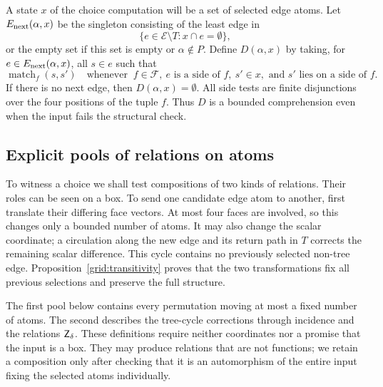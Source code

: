 A state \(x\) of the choice computation will be a set of selected edge
atoms. Let \(E_{\rm next}(\alpha,x)\) be the singleton consisting of the
least edge in
\[
 \{e\in\mathcal E\setminus T:x\cap e=\emptyset\},
\]
or the empty set if this set is empty or \(\alpha\notin P\).
Define \(D(\alpha,x)\) by taking, for \(e\in E_{\rm next}(\alpha,x)\),
all \(s\in e\) such that
\begin{equation}
 \operatorname{match}_f(s,s')
 \quad\text{whenever }\
 f\in\mathcal F,\ e\text{ is a side of }f,\ s'\in x,
 \text{ and }s'\text{ lies on a side of }f.
 \label{sen:candidates}
\end{equation}
If there is no next edge, then \(D(\alpha,x)=\emptyset\).
All side tests are finite disjunctions over the four positions of the
tuple \(f\). Thus \(D\) is a bounded comprehension even when the input
fails the structural check.

\subsection{Explicit pools of relations on atoms}

To witness a choice we shall test compositions of two kinds of relations.
Their roles can be seen on a box. To send one candidate edge atom to
another, first translate their differing face vectors. At most four faces
are involved, so this changes only a bounded number of atoms. It may also
change the scalar coordinate; a circulation along the new edge and its
return path in \(T\) corrects the remaining scalar difference. This cycle
contains no previously selected non-tree edge. Proposition~\ref{grid:transitivity}
proves that the two transformations fix all previous selections and
preserve the full structure.

The first pool below contains every permutation moving at most a fixed
number of atoms. The second describes the tree-cycle corrections through
incidence and the relations \(\mathsf Z_\delta\). These definitions require
neither coordinates nor a promise that the input is a box. They may
produce relations that are not functions; we retain a composition only
after checking that it is an automorphism of the entire input fixing
the selected atoms individually.

